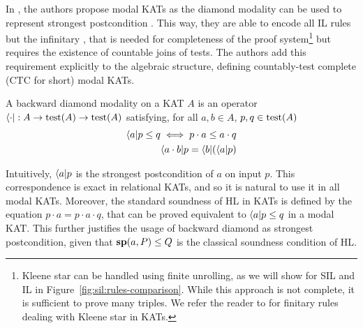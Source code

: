 In \cite{MOH21}, the authors propose modal KATs as the diamond modality can be used to represent strongest postcondition \cite{DMS06}. This way, they are able to encode all IL rules but the infinitary , that is needed for completeness of the proof system\footnote{Kleene star can be handled using finite unrolling, as we will show for SIL and IL in Figure~\ref{fig:sil:rules-comparison}. While this approach is not complete, it is sufficient to prove many triples. We refer the reader to \cite[Figure~2]{MOH21} for finitary rules dealing with Kleene star in KATs.} but requires the existence of countable joins of tests. The authors add this requirement explicitly to the algebraic structure, defining countably-test complete (CTC for short) modal KATs.
\begin{definition}
	A backward diamond modality on a KAT $A$ is an operator $\langle \cdot \vert : A \rightarrow \text{test}(A) \rightarrow \text{test}(A)$ satisfying, for all $a, b \in A$, $p, q \in \text{test}(A)$
	\begin{align*}
		\langle a \vert p \le q \iff p \cdot a \le a \cdot q \\
		\langle a \cdot b \vert p = \langle b \vert (\langle a \vert p)
	\end{align*}
\end{definition}
Intuitively, $\langle a \vert p$ is the strongest postcondition of $a$ on input $p$. This correspondence is exact in relational KATs, and so it is natural to use it in all modal KATs. Moreover, the standard soundness of HL in KATs is defined by the equation $p \cdot a = p \cdot a \cdot q$, that can be proved equivalent to $\langle a \vert p \le q$ in a modal KAT. This further justifies the usage of backward diamond as strongest postcondition, given that $\textbf{sp}(a, P) \le Q$ is the classical soundness condition of HL.

